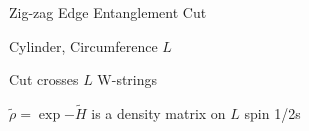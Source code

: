 \begin{frame}{Zig-zag Edge Entanglement Cut}
\vskip-1.5cm
\begin{figure}[h]
\scalebox{1}{

}
\end{figure}
\bi 
\item Cylinder, Circumference $L$
\item Cut crosses $L$ W-strings
\item $\widetilde{\rho} = \exp{-\widetilde{H}}$ is a density matrix on $L$ spin 1/2s 
\ei 
\end{frame}